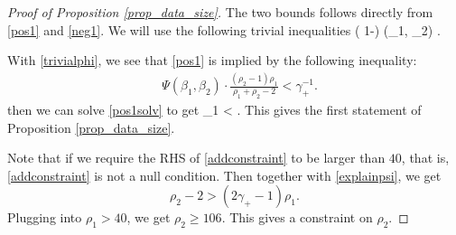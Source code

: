 \begin{proof}[Proof of Proposition \ref{prop_data_size}]
The two bounds follows directly from \eqref{pos1} and \eqref{neg1}. We will use the following trivial inequalities 
\be\label{trivialphi}
\cdot \left( 1-\right) \le  \Phi(\rho_1, \rho_2) \le  {}.
\ee

%

 With \eqref{trivialphi}, we see that \eqref{pos1} is implied by the following inequality:
\begin{align}\label{pos1solv}
 &  \Psi(\beta_1,\beta_2) \cdot \frac{(\rho_2-1) \rho_1 }{\rho_1+\rho_2-2}   < \gamma_+^{-1} .
 \end{align}
 then we can solve \eqref{pos1solv} to get
 \be\label{addconstraint}\rho_1 <   .\ee
 This gives the first statement of Proposition \ref{prop_data_size}. %
 
 
 Note that if we require the RHS of \eqref{addconstraint} to be larger than $40$, that is, \eqref{addconstraint} is not a null condition. Then together with \eqref{explainpsi}, we get
 $$ \rho_2 - 2>( 2\gamma_+ -1)\rho_1 .$$
Plugging into $\rho_1>40$, we get $\rho_2 \ge 106$. This gives a constraint on $\rho_2$. 
 


\end{proof}
